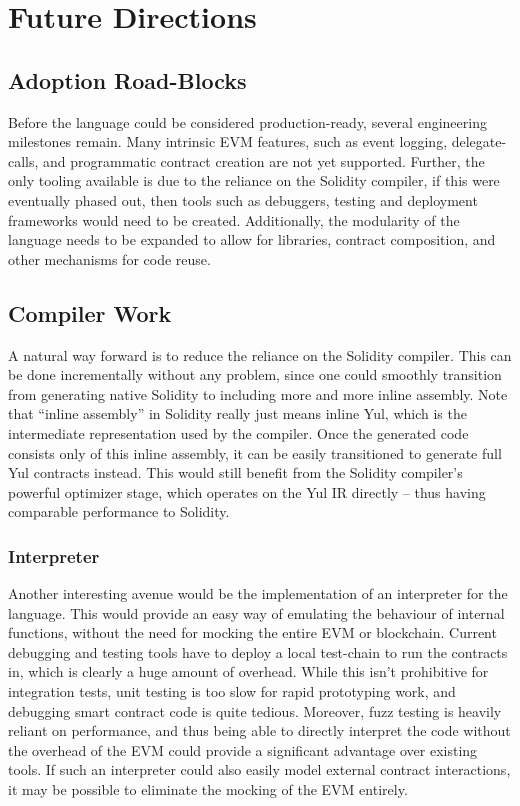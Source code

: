\section{Future Directions}

\subsection{Adoption Road-Blocks}
Before the language could be considered production-ready, several engineering milestones remain. Many intrinsic EVM features, such as event logging, delegate-calls, and programmatic contract creation are not yet supported. Further, the only tooling available is due to the reliance on the Solidity compiler, if this were eventually phased out, then tools such as debuggers, testing and deployment frameworks would need to be created. Additionally, the modularity of the language needs to be expanded to allow for libraries, contract composition, and other mechanisms for code reuse.

\subsection{Compiler Work}
A natural way forward is to reduce the reliance on the Solidity compiler. This can be done incrementally without any problem, since one could smoothly transition from generating native Solidity to including more and more inline assembly. Note that ``inline assembly'' in Solidity really just means inline Yul, which is the intermediate representation used by the compiler. Once the generated code consists only of this inline assembly, it can be easily transitioned to generate full Yul contracts instead. This would still benefit from the Solidity compiler's powerful optimizer stage, which operates on the Yul IR directly -- thus having comparable performance to Solidity.

\subsubsection{Interpreter}
Another interesting avenue would be the implementation of an interpreter for the language. This would provide an easy way of emulating the behaviour of internal functions, without the need for mocking the entire EVM or blockchain. Current debugging and testing tools have to deploy a local test-chain to run the contracts in, which is clearly a huge amount of overhead. While this isn't prohibitive for integration tests, unit testing is too slow for rapid prototyping work, and debugging smart contract code is quite tedious. Moreover, fuzz testing is heavily reliant on performance, and thus being able to directly interpret the code without the overhead of the EVM could provide a significant advantage over existing tools. If such an interpreter could also easily model external contract interactions, it may be possible to eliminate the mocking of the EVM entirely.

